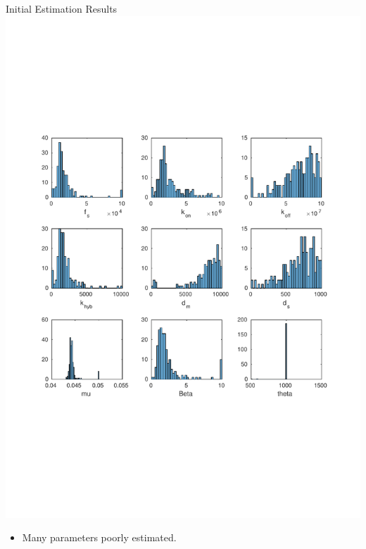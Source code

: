 \documentclass{beamer}
\begin{document}
\begin{frame}{Initial Estimation Results}
  \includegraphics[scale = 0.22, clip = true, trim = 0 0 0 0]{../Figures/13_9_hist}
        \begin{itemize}
    \item Many parameters poorly estimated.
            \end{itemize}
\end{frame}
\end{document}
